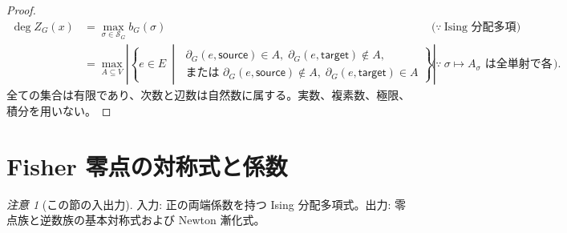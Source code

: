 \documentclass[11pt,a4paper]{article}
\theoremstyle{remark}
\newtheorem{remark}[definition]{注意}
\begin{document}
\begin{proof}
\[\begin{aligned}
\deg Z_G(x)
&=
\max_{\sigma\in\mathcal S_G}b_G(\sigma)
&&\bigl(\because\ \text{Ising 分配多項式の次数と最大破れ辺数}\bigr)\\
&=
\max_{A\subseteq V}
\left|
  \left\{
    e\in E
    \ \middle|\;
    \begin{array}{l}
      \partial_G(e,\mathsf{source})\in A,\;
      \partial_G(e,\mathsf{target})\notin A,\\
      \text{または }\partial_G(e,\mathsf{source})\notin A,\;
      \partial_G(e,\mathsf{target})\in A
    \end{array}
  \right\}
\right|
&&\bigl(\because\ \sigma\mapsto A_\sigma\text{ は全単射で各辺数を保存する}\bigr).
\end{aligned}\]
全ての集合は有限であり、次数と辺数は自然数に属する。実数、複素数、極限、積分を用いない。

\end{proof}

\section{Fisher 零点の対称式と係数}

\begin{remark}[この節の入出力]
入力: 正の両端係数を持つ Ising 分配多項式。出力: 零点族と逆数族の基本対称式および Newton 漸化式。

\end{remark}
\end{document}
